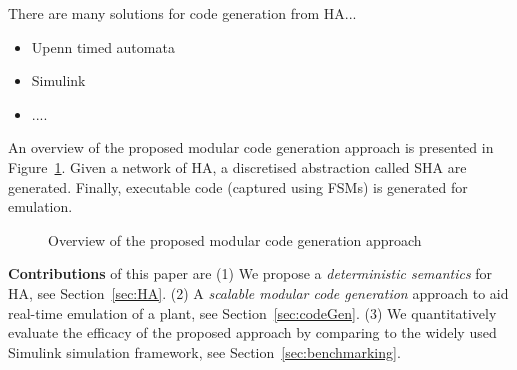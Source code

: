 There are many solutions for code generation from \acf{HA}...
\begin{itemize}
	\item Upenn timed automata
	\item Simulink
	\item ....
\end{itemize}
 

   
 An overview of the proposed modular code generation approach is presented
 in Figure~\ref{fig:overview}. Given a network
 of \ac{HA}, a discretised abstraction called \ac{SHA} are generated.
 Finally, executable code (captured using FSMs)  is generated for emulation.
 
 \begin{figure}[bthp]
 	\centering
 	\scalebox{0.7}{
	 
	}
	 \caption{Overview of the proposed modular 
	 	code generation approach \label{fig:overview}}
\end{figure}
      
  \textbf{Contributions} of this paper are 
  (1) We propose a \emph{deterministic semantics} for \acf{HA}, see Section~\ref{sec:HA}.
  (2) A \emph{scalable modular code generation} approach 
  to aid real-time emulation of a plant, see Section~\ref{sec:codeGen}.
  (3) We quantitatively evaluate the efficacy of the 
  proposed approach by comparing  
  to the widely used Simulink\textsuperscript{\textregistered}
  simulation framework, see Section~\ref{sec:benchmarking}.
 
